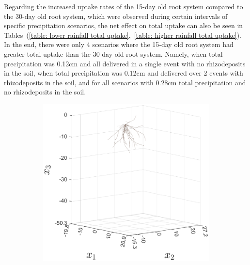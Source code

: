 \documentclass[11pt,a4paper]{article}
\numberwithin{equation}{section}
\begin{document}
Regarding the increased uptake rates of the 15-day old root system compared to the 30-day old root system, which were observed during certain intervals of specific precipitation scenarios, the net effect on total uptake can also be seen in Tables~(\ref{table: lower rainfall total uptake},~\ref{table: higher rainfall total uptake}). In the end, there were only 4 scenarios where the 15-day old root system had greater total uptake than the 30 day old root system. Namely, when total precipitation was 0.12cm and all delivered in a single event with no rhizodeposits in the soil, when total precipitation was 0.12cm and delivered over 2 events with rhizodeposits in the soil, and for all scenarios with 0.28cm total precipitation and no rhizodeposits in the soil. 

\begin{figure}
	\centering
	\begin{subfigure}{0.275\textwidth}
		\includegraphics[width = \linewidth, keepaspectratio] {trigo6days1_3D_plot.eps}
		\caption{}
	\end{subfigure}\qquad
	\begin{subfigure}{0.275\textwidth}

\end{subfigure}
\end{figure}
\end{document}
